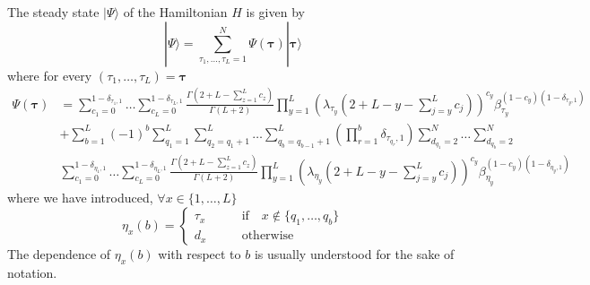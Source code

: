 \documentclass[10pt]{article}
\numberwithin{equation}{section}
\numberwithin{equation}{subsection}
\begin{document}
The steady state $|\Psi\rangle$ of the Hamiltonian $H$ is given by 
\begin{equation}\label{steadyStateH}
	|\Psi\rangle=\sum_{\tau_{1},\ldots,\tau_{L}=1}^{N}\Psi(\bm{\tau})|\bm{\tau}\rangle
\end{equation}
where for every $(\tau_{1},\ldots,\tau_{L})=\bm{\tau}$
\begin{equation}
	\begin{split}
		\Psi(\bm{\tau})&=\sum_{c_{1}=0}^{1-\delta_{\tau_{1},1}}\ldots\sum_{c_{L}=0}^{1-\delta_{\tau_{L},1}}\frac{\Gamma(2+L-\sum_{z=1}^{L}c_{z})}{\Gamma(L+2)}\prod_{y=1}^{L}\left(\lambda_{\tau_{y}}\left(2+L-y-\sum_{j=y}^{L}c_{j}\right)\right)^{c_{y}}\beta_{\tau_{y}}^{(1-c_{y})(1-\delta_{\tau_{y},1})}
		\\&+
		\sum_{b=1}^{L}(-1)^{b}\sum_{q_{1}=1}^{L}\sum_{q_{2}=q_{1}+1}^{L}\ldots\sum_{q_{b}=q_{b-1}+1}^{L}\left(\prod_{r=1}^{b}\delta_{\tau_{q_{r}},1}\right) 
		\sum_{d_{q_{1}}=2}^{N}\ldots\sum_{d_{q_{b}}=2}^{N}
		\\&
		\sum_{c_{1}=0}^{1-\delta_{\eta_{1},1}}\ldots\sum_{c_{L}=0}^{1-\delta_{\eta_{L},1}}\frac{\Gamma(2+L-\sum_{z=1}^{L}c_{z})}{\Gamma(L+2)}\prod_{y=1}^{L}\left(\lambda_{\eta_{y}}\left(2+L-y-\sum_{j=y}^{L}c_{j}\right)\right)^{c_{y}}\beta_{\eta_{y}}^{(1-c_{y})(1-\delta_{\eta_{y},1})}
	\end{split}
\end{equation}
where we have introduced, $\forall x\in \{1,\ldots,L\}$
\begin{equation}
	\eta_{x}(b)=\begin{cases}
		\tau_{x}\qquad &\text{if}\quad x\notin \{q_{1},\ldots,q_{b}\}\\
		d_{x}\qquad &\text{otherwise}
	\end{cases}%
	\end{equation}
	The dependence of $\eta_{x}(b)$ with respect to $b$ is usually understood for the sake of notation. 
\end{document}
